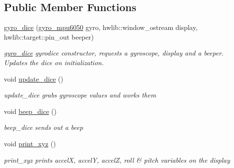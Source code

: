\subsection*{Public Member Functions}
\begin{DoxyCompactItemize}
\item 
\mbox{\label{classgyro__dice_a5d9a01ed984a63bdc59a665c75d0059e}} 
\hyperlink{classgyro__dice_a5d9a01ed984a63bdc59a665c75d0059e}{gyro\+\_\+dice} (\hyperlink{classgyro__mpu6050}{gyro\+\_\+mpu6050} gyro, hwlib\+::window\+\_\+ostream display, hwlib\+::target\+::pin\+\_\+out beeper)
\begin{DoxyCompactList}\small\item\em \hyperlink{classgyro__dice}{gyro\+\_\+dice} gyrodice constructor, requests a gyroscope, display and a beeper. Updates the dice on initialization. \end{DoxyCompactList}\item 
\mbox{\label{classgyro__dice_abdf92bf238356ada218a1bdb560044b1}} 
void \hyperlink{classgyro__dice_abdf92bf238356ada218a1bdb560044b1}{update\+\_\+dice} ()
\begin{DoxyCompactList}\small\item\em update\+\_\+dice grabs gyroscope values and works them \end{DoxyCompactList}\item 
\mbox{\label{classgyro__dice_ab3bb2c5298f7fb2e53f8b639d4520cf7}} 
void \hyperlink{classgyro__dice_ab3bb2c5298f7fb2e53f8b639d4520cf7}{beep\+\_\+dice} ()
\begin{DoxyCompactList}\small\item\em beep\+\_\+dice sends out a beep \end{DoxyCompactList}\item 
\mbox{\label{classgyro__dice_a4c3a9c9c4be7988e33ab079278c81f89}} 
void \hyperlink{classgyro__dice_a4c3a9c9c4be7988e33ab079278c81f89}{print\+\_\+xyz} ()
\begin{DoxyCompactList}\small\item\em print\+\_\+xyz prints accelX, accelY, accelZ, roll \& pitch variables on the display \end{DoxyCompactList}\item 
\mbox{\label{classgyro__dice_afe35725bea57da1a491da5c159fbe201}} 

\end{DoxyCompactItemize}
